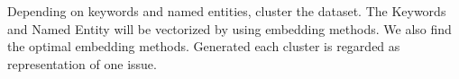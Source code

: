 Depending on keywords and named entities, cluster the dataset. The Keywords and Named Entity will be vectorized by using embedding methods. We also find the optimal embedding methods. Generated each cluster is regarded as representation of one issue.